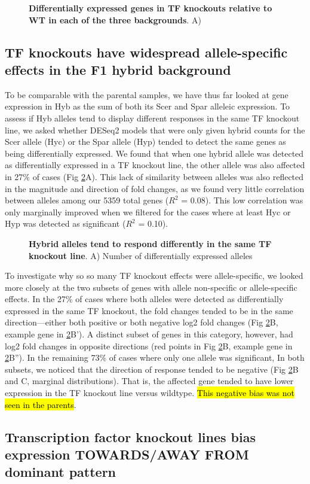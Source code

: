 \begin{figure}
     \caption{\textbf{Differentially expressed genes in TF knockouts relative to WT in each of the three backgrounds}. A)}
    \label{fig:tfdel}
\end{figure}

\subsection{TF knockouts have widespread allele-specific effects in the F1 hybrid background}

To be comparable with the parental samples, we have thus far looked at gene expression in Hyb as the sum of both its Scer and Spar alleleic expression. To assess if Hyb alleles tend to display different responses in the same TF knockout line, we asked whether DESeq2 models that were only given hybrid counts for the Scer allele (Hyc) or the Spar allele (Hyp) tended to detect the same genes as being differentially expressed. We found that when one hybrid allele was detected as differentially expressed in a TF knockout line, the other allele was also affected in 27\% of cases (Fig \ref{fig:alleleic}A). This lack of similarity between alleles was also reflected in the magnitude and direction of fold changes, as we found very little correlation between alleles among our 5359 total genes ($R^2$ = 0.08). This low correlation was only marginally improved when we filtered for the cases where at least Hyc or Hyp was detected as significant ($R^2$ = 0.10).

\begin{figure}
     \caption{\textbf{Hybrid alleles tend to respond differently in the same TF knockout line}. A) Number of differentially expressed alleles}
    \label{fig:alleleic}
\end{figure}

To investigate why so so many TF knockout effects were allele-specific, we looked more closely at the two subsets of genes with allele non-specific or allele-specific effects. In the 27\% of cases where both alleles were detected as differentially expressed in the same TF knockout, the fold changes tended to be in the same direction---either both positive or both negative log2 fold changes (Fig \ref{fig:alleleic}B, example gene in \ref{fig:alleleic}B'). A distinct subset of genes in this category, however, had log2 fold changes in opposite directions (red points in Fig \ref{fig:alleleic}B, example gene in \ref{fig:alleleic}B''). In the remaining 73\% of cases where only one allele was significant, In both subsets, we noticed that the direction of response tended to be negative (Fig \ref{fig:alleleic}B and C, marginal distributions). That is, the affected gene tended to have lower expression in the TF knockout line versus wildtype. \hl{This negative bias was not seen in the parents}.

\subsection{Transcription factor knockout lines bias expression TOWARDS/AWAY FROM dominant pattern}

\blindtext

